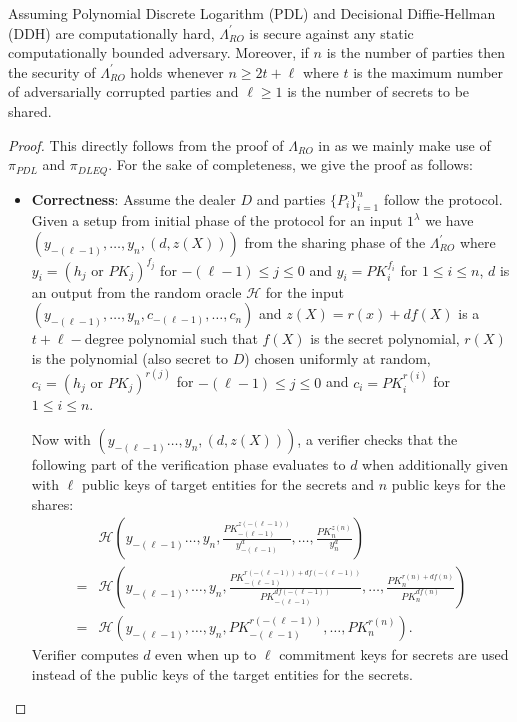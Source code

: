 \begin{theorem}\label{th:init-lambda_ro}
  Assuming Polynomial Discrete Logarithm (PDL) and Decisional Diffie-Hellman (DDH) are 
  computationally hard, $\Lambda_{RO}^{'}$ is secure against any 
  static computationally bounded adversary. Moreover, if $n$ is the number of parties then the 
  security of $\Lambda_{RO}^{'}$ holds whenever $n\geq 2t+\ell$ where $t$ is the maximum number of
  adversarially corrupted parties and $\ell\geq 1$ is the number of secrets to be shared.
\end{theorem}
\begin{proof}
  This directly follows from the proof of $\Lambda_{RO}$ in \cite{cryptoeprint:2025/576} as we mainly make use of 
  $\pi_{PDL}$ and $\pi_{DLEQ}$. For the sake of completeness, we give the proof as follows: 
  \begin{itemize}
    \item \textbf{Correctness}: Assume the dealer $D$ and parties $\{P_i\}_{i=1}^n$ follow the protocol. Given a 
    setup from initial phase of the protocol for an input $1^\lambda$ we have $(y_{-(\ell-1)},\dots,y_n,(d,z(X)))$ from 
    the sharing phase of the $\Lambda_{RO}^{'}$ where 
    $y_i=(h_j\text{ or }PK_j)^{f_j}$ for $-(\ell-1)\leq j\leq 0$ and $y_i=PK_i^{f_i}$ for $1\leq i\leq n$, 
    $d$ is an output 
    from the random oracle $\mathcal{H}$ for the input $(y_{-(\ell-1)},\dots,y_n,c_{-(\ell-1)},\dots,c_n)$ and $z(X)=r(x)+df(X)$ 
    is a $t+\ell-$degree polynomial such that $f(X)$ is the secret polynomial, $r(X)$ is the polynomial (also secret to $D$) 
    chosen uniformly at random, $c_i=(h_j\text{ or }PK_j)^{r(j)}$ for $-(\ell-1)\leq j\leq 0$ and 
    $c_i=PK_i^{r(i)}$ for $1\leq i\leq n$.\par 

    Now with $(y_{-(\ell-1)}\dots,y_n,(d,z(X)))$, a verifier checks that the following part of the verification phase evaluates to $d$ 
    when additionally given with $\ell$ public keys of target entities for the secrets and $n$ public keys for the shares:
    \begin{align*}
      &\mathcal{H}(y_{-(\ell-1)}\dots,y_n,\frac{PK_{-(\ell-1)}^{z(-(\ell-1))}}{y_{-(\ell-1)}^d},\dots,\frac{PK_n^{z(n)}}{y_n^d})\\
      =&\mathcal{H}(y_{-(\ell-1)},\dots,y_n,\frac{PK_{-(\ell-1)}^{r(-(\ell-1))+df(-(\ell-1))}}{PK_{-(\ell-1)}^{df(-(\ell-1))}},\dots,\frac{PK_n^{r(n)+df(n)}}{PK_n^{df(n)}})\\
      =&\mathcal{H}(y_{-(\ell-1)},\dots,y_n,PK_{-(\ell-1)}^{r(-(\ell-1))},\dots,PK_n^{r(n)}).
    \end{align*}
    Verifier computes $d$ even when up to $\ell$ commitment keys for secrets are used instead of the public keys 
    of the target entities for the secrets.\par 
    

\end{itemize}
\end{proof}
